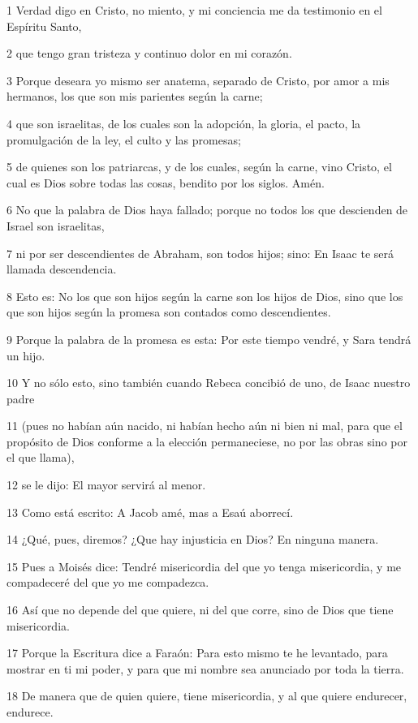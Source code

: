 \par 1 Verdad digo en Cristo, no miento, y mi conciencia me da testimonio en el Espíritu Santo,
\par 2 que tengo gran tristeza y continuo dolor en mi corazón.
\par 3 Porque deseara yo mismo ser anatema, separado de Cristo, por amor a mis hermanos, los que son mis parientes según la carne;
\par 4 que son israelitas, de los cuales son la adopción, la gloria, el pacto, la promulgación de la ley, el culto y las promesas;
\par 5 de quienes son los patriarcas, y de los cuales, según la carne, vino Cristo, el cual es Dios sobre todas las cosas, bendito por los siglos. Amén.
\par 6 No que la palabra de Dios haya fallado; porque no todos los que descienden de Israel son israelitas,
\par 7 ni por ser descendientes de Abraham, son todos hijos; sino: En Isaac te será llamada descendencia.
\par 8 Esto es: No los que son hijos según la carne son los hijos de Dios, sino que los que son hijos según la promesa son contados como descendientes.
\par 9 Porque la palabra de la promesa es esta: Por este tiempo vendré, y Sara tendrá un hijo.
\par 10 Y no sólo esto, sino también cuando Rebeca concibió de uno, de Isaac nuestro padre
\par 11 (pues no habían aún nacido, ni habían hecho aún ni bien ni mal, para que el propósito de Dios conforme a la elección permaneciese, no por las obras sino por el que llama),
\par 12 se le dijo: El mayor servirá al menor.
\par 13 Como está escrito: A Jacob amé, mas a Esaú aborrecí.
\par 14 ¿Qué, pues, diremos? ¿Que hay injusticia en Dios? En ninguna manera.
\par 15 Pues a Moisés dice: Tendré misericordia del que yo tenga misericordia, y me compadeceré del que yo me compadezca.
\par 16 Así que no depende del que quiere, ni del que corre, sino de Dios que tiene misericordia.
\par 17 Porque la Escritura dice a Faraón: Para esto mismo te he levantado, para mostrar en ti mi poder, y para que mi nombre sea anunciado por toda la tierra.
\par 18 De manera que de quien quiere, tiene misericordia, y al que quiere endurecer, endurece.
